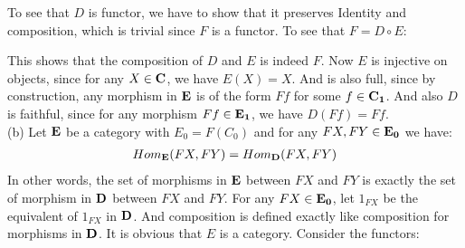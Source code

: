 To see that $D$ is functor, we have to show that it preserves Identity and composition, which is trivial since $F$ is a functor. To see that $F = D \circ E$:
\begin{center}
\end{center}
This shows that the composition of $D$ and $E$ is indeed $F$. Now $E$ is injective on objects, since for any $X \in \bf C$, we have $E(X) = X$. And is also full, since by construction, any morphism in $\bf E$ is of the form $Ff$ for some $f \in \bf C_1$.
And also $D$ is faithful, since for any morphism $Ff \in \bf E_1$, we have $D(Ff) = Ff$. 
\vspace{0.7cm} \\
\phantom{llll}(b) Let $\bf E$ be a category with $E_0 = F(C_0)$ and for any $FX, FY \in \bf E_0$ we have:
\begin{gather*}
    Hom_{\bf E}(FX, FY) = Hom_{\bf D}(FX, FY)
\end{gather*}
In other words, the set of morphisms in $\bf E$ between $FX$ and $FY$ is exactly the set of morphism in $\bf D$ between $FX$ and $FY$.
For any $FX \in \bf E_0$, let $1_{FX}$ be the equivalent of $1_{FX}$ in $\bf D$.
And composition is defined exactly like composition for morphisms in $\bf D$. It is obvious that $E$ is a category. Consider the functors:
\begin{center}
\end{center}
